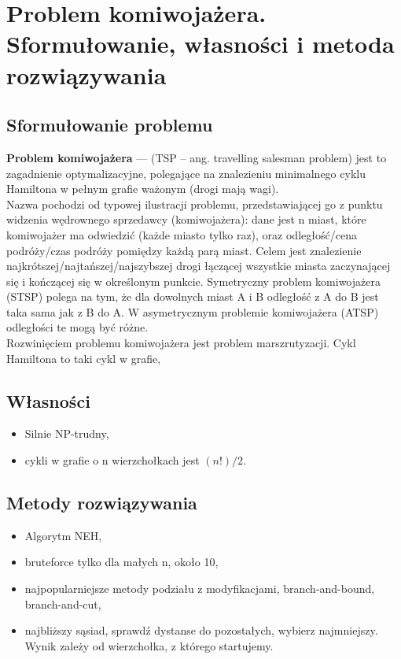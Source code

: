\documentclass[10pt, a
4paper]{article}
\begin{document}
\newpage
\section{Problem komiwojażera. Sformułowanie, własności i metoda rozwiązywania}
\subsection{Sformułowanie problemu}
\noindent \textbf{Problem komiwojażera} --- (TSP -- ang. travelling salesman problem) jest to zagadnienie optymalizacyjne, polegające na znalezieniu minimalnego cyklu Hamiltona w pełnym grafie ważonym (drogi mają wagi).\\
Nazwa pochodzi od typowej ilustracji problemu, przedstawiającej go z punktu widzenia wędrownego sprzedawcy (komiwojażera): dane jest n miast, które komiwojażer ma odwiedzić (każde miasto tylko raz), oraz odległość/cena podróży/czas podróży pomiędzy każdą parą miast. Celem jest znalezienie najkrótszej/najtańszej/najszybszej drogi łączącej wszystkie miasta zaczynającej się i kończącej się w określonym punkcie.
Symetryczny problem komiwojażera (STSP) polega na tym, że dla dowolnych miast A i B odległość z A do B jest taka sama jak z B do A. W asymetrycznym problemie komiwojażera (ATSP) odległości te mogą być różne.\\
Rozwinięciem problemu komiwojażera jest problem marszrutyzacji.
Cykl Hamiltona to taki cykl w grafie,

\subsection{Własności}
\begin{itemize}
\item Silnie NP-trudny,
\item cykli w grafie o n wierzchołkach jest $(n!)/2$.
\end{itemize}

\subsection{Metody rozwiązywania}
\begin{itemize}
\item Algorytm NEH,
\item bruteforce tylko dla małych n, około 10,
\item najpopularniejsze metody podziału z modyfikacjami, branch-and-bound, branch-and-cut,
\item najbliższy sąsiad, sprawdź dystanse do pozostałych, wybierz najmniejszy. Wynik zależy od wierzchołka, z którego startujemy.
\end{itemize}
\end{document}
